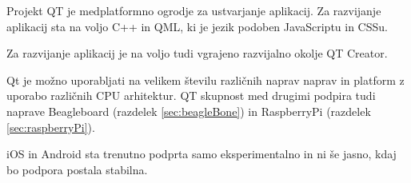 Projekt QT je medplatformno ogrodje za ustvarjanje aplikacij. Za razvijanje aplikacij sta na voljo C++ in QML, ki je jezik podoben JavaScriptu in CSSu.

Za razvijanje aplikacij je na voljo tudi vgrajeno razvijalno okolje QT Creator.

Qt je možno uporabljati na velikem številu različnih naprav naprav in platform z uporabo različnih CPU arhitektur. QT skupnost med drugimi podpira tudi naprave Beagleboard (razdelek \ref{sec:beagleBone}) in RaspberryPi (razdelek \ref{sec:raspberryPi}). 

iOS in Android sta trenutno podprta samo eksperimentalno in ni še jasno, kdaj bo podpora postala stabilna.%